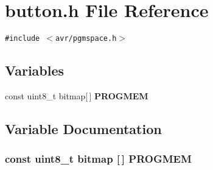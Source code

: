 \section{button.h File Reference}
\label{button_8h}
{\tt \#include $<$avr/pgmspace.h$>$}\par
\subsection*{Variables}
\begin{CompactItemize}
\item 
const uint8\_\-t bitmap[$\,$] {\bf PROGMEM}
\end{CompactItemize}


\subsection{Variable Documentation}
\subsubsection{\setlength{\rightskip}{0pt plus 5cm}const uint8\_\-t bitmap [$\,$] {\bf PROGMEM}}\label{button_8h_1ca6393a353d3dde5511786a4d7cc139}


